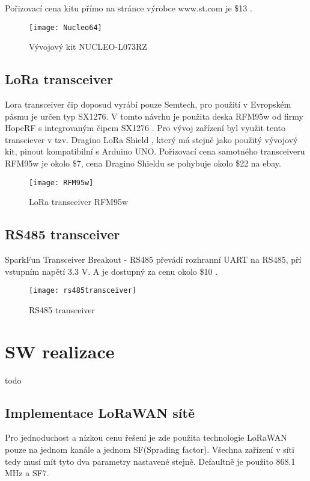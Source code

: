Pořizovací cena kitu přímo na stránce výrobce www.st.com je \$13 \cite{nucleoST} \cite{nucleoMbed}.
\begin{figure}[!h]
    \centering
    \texttt{[image: Nucleo64]}
    \caption{Vývojový kit NUCLEO-L073RZ \cite{nucleoST}}
    \label{fig:02}
\end{figure}

\subsection{LoRa transceiver}
Lora transceiver čip doposud vyrábí pouze Semtech, pro použití v Evropském pásmu je určen typ SX1276.
V tomto návrhu je použita deska RFM95w od firmy HopeRF s integrovaným čipem SX1276 \cite{RFM95w}.
Pro vývoj zařízení byl využit tento transciever v tzv. Dragino LoRa Shield \cite{draginoWiki}, který má stejně jako použitý vývojový kit, pinout kompatibilní s Arduino UNO. Pořizovací cena samotného transceiveru RFM95w je okolo \$7, cena Dragino Shieldu se pohybuje okolo \$22 na ebay.

\begin{figure}[!h]
    \centering
    \texttt{[image: RFM95w]}
    \caption{LoRa transceiver RFM95w \cite{RFM95w}}
    \label{fig:02}
\end{figure}

\subsection{RS485 transceiver}
SparkFun Transceiver Breakout - RS485 převádí rozhranní UART na RS485, pří vstupním napětí 3.3 V. A je dostupný za cenu okolo \$10 \cite{rs485tr}.

\begin{figure}[!h]
    \centering
    \texttt{[image: rs485transceiver]}
    \caption{RS485 transceiver \cite{rs485tr}}
    \label{fig:rs485transceiver}
\end{figure}



\newpage
\section{SW realizace}
todo
\subsection{Implementace LoRaWAN sítě}
Pro jednoduchost a nízkou cenu řešení je zde použita technologie LoRaWAN pouze na jednom kanále a jednom SF(Sprading factor). Všechna zařízení v síti tedy musí mít tyto dva parametry nastavené stejně. Defaultně je použito 868.1 MHz a SF7.

